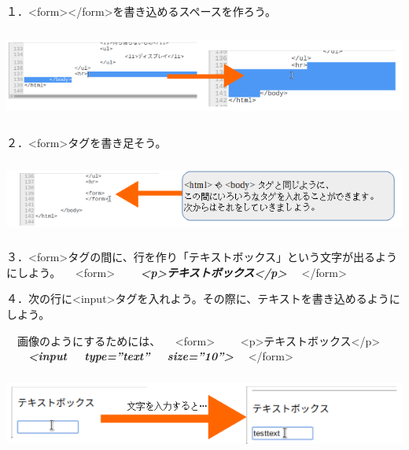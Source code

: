 \documentclass[a4paper,12pt,dvipdfmx]{jarticle}
\begin{document}
１．{\textless}form{\textgreater}{\textless}/form{\textgreater}を書き込めるスペースを作ろう。



\centering
\includegraphics[width=17.006cm,height=3.046cm]{ome7-img035.png}
\flushleft

２．{\textless}form{\textgreater}タグを書き足そう。



\centering
\includegraphics[width=17.006cm,height=2.454cm]{ome7-img036.png}
\flushleft


\bigskip


\bigskip

３．{\textless}form{\textgreater}タグの間に、行を作り「テキストボックス」という文字が出るようにしよう。\newline
\ \ {\textless}form{\textgreater}\newline
\ \ \ \ \textbf{\textit{{\textless}p{\textgreater}テキストボックス{\textless}/p{\textgreater}}}\newline
\ \ {\textless}/form{\textgreater}

４．次の行に{\textless}input{\textgreater}タグを入れよう。その際に、テキストを書き込めるようにしよう。

\ \ 画像のようにするためには、\newline
\ \ {\textless}form{\textgreater}\newline
\ \ \ \ {\textless}p{\textgreater}テキストボックス{\textless}/p{\textgreater}\newline
\ \ \ \ \textbf{\textit{{\textless}input \ \ type=”text” \ \ size=”10”{\textgreater}}}\newline
\ \ {\textless}/form{\textgreater}

\centering
\includegraphics[width=16.3cm,height=2.54cm]{ome7-img037.png}
\flushleft
\end{document}
